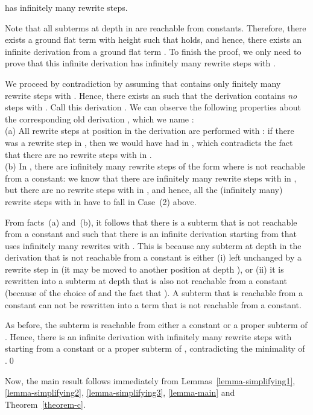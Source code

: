 \documentclass{LMCS}
\theoremstyle{plain}
\begin{document}
has infinitely many rewrite steps.

Note that all subterms at depth  in 
are reachable from constants. Therefore,
there exists a ground flat term  with height  such that
 holds, and hence, there exists
an infinite derivation from a ground flat term .
To finish the proof, we only need to prove that this
infinite derivation has infinitely many rewrite steps with .

We proceed by contradiction
by assuming that
 contains only finitely many rewrite steps
with .  Hence, there exists an  such that
the derivation
 contains {\em{no}} steps with .
Call this derivation .
We can observe the following properties about the
corresponding old derivation
, which we name :
\\
(a) All rewrite steps at position  in 
the derivation  are performed with :  
if there was a rewrite step 
 in , then
we would have had 
 in , which 
contradicts the fact that there are no rewrite steps 
with  in .
\\
(b) In , there are infinitely many rewrite steps of
the form  where  is
not reachable from a constant:
we know that there are infinitely many rewrite steps with 
in , but there are no rewrite steps with  in ,
and hence, all the (infinitely many) rewrite steps with 
in  have to fall in Case~(2) above.

From facts~(a) and~(b), it follows that there is a subterm
 that is not reachable from a constant and
such that there is an infinite derivation
starting from  that uses infinitely many rewrites with . 
This is because any subterm at depth  in the derivation 
that is not reachable from a constant is either
(i) left unchanged by a rewrite step in  (it may be moved to
another position at depth ), or
(ii) it is rewritten into a subterm at depth  that is also not
reachable from a constant (because of the choice of  and the fact
that ). A subterm that is reachable from a constant can not
be rewritten into a term that is not reachable from a constant.

As before, the subterm  is reachable
from either a constant or a proper subterm of .
Hence, there is an infinite derivation with infinitely
many rewrite steps with  starting from a constant or
a proper subterm of , contradicting the
minimality of .\qed 





Now, the main result follows immediately
from Lemmas~\ref{lemma-simplifying1}, \ref{lemma-simplifying2},
\ref{lemma-simplifying3}, \ref{lemma-main} and 
Theorem~\ref{theorem-c}.
\end{document}
